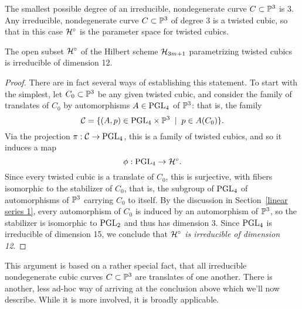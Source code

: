 The smallest possible degree of an irreducible, nondegenerate curve $C \subset \PP^3$ is 3. Any irreducible, nondegenerate curve $C \subset \PP^3$ of degree 3 is a twisted cubic, so that in this case $\cH^\circ$ is the parameter space for twisted cubics.

\begin{proposition}\label{hilb of twisted cubics}
The open subset $\cH^\circ$ of the Hilbert scheme $\cH_{3m+1}$ parametrizing twisted cubics is irreducible of dimension 12.
\end{proposition}

\begin{proof}  There are in fact several ways of establishing this statement. To start with the simplest, let $C_0 \subset \PP^3$ be any given twisted cubic, and consider the family of translates of $C_0$ by automorphisms $A \in \PGL_4$ of $\PP^3$: that is, the family
$$
\cC = \{ (A, p) \in \PGL_4 \times \PP^3 \; \mid \; p \in A(C_0) \}.
$$
Via the projection $\pi : \cC \to \PGL_4$, this is a family of twisted cubics, and so it induces a map
$$
\phi : \PGL_4 \to \cH^\circ.
$$
Since every twisted cubic is a translate of $C_0$, this is surjective, with fibers isomorphic to the stabilizer of $C_0$, that is, the subgroup of $\PGL_4$ of automorphisms of $\PP^3$ carrying $C_0$ to itself. By the discussion in Section~\ref{linear series 1}, every automorphism of $C_{0}$ is induced by an automorphism of $\PP^{3}$, so the stabilizer is isomorphic to $\PGL_2$ and  thus has dimension 3. Since $\PGL_4$ is irreducible of dimension 15, we conclude that \emph{$\cH^\circ$ is irreducible of dimension 12}.
\end{proof}

This argument is based on a rather special fact, that all irreducible nondegenerate cubic curves $C \subset \PP^3$ are translates of one another. There is another, less ad-hoc way of arriving at the conclusion above which we'll now describe. While it is more involved, it is broadly applicable.

